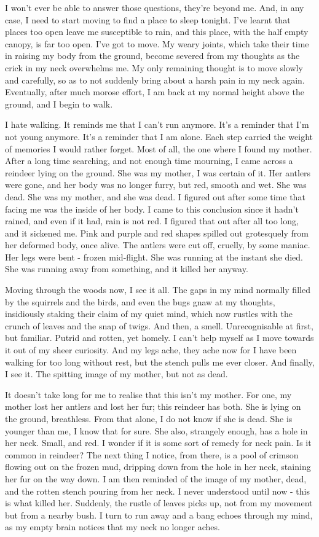 I won't ever be able to answer those questions, they're beyond me. And, in any case, I
need to start moving to find a place to sleep tonight. I've learnt that places too open
leave me susceptible to rain, and this place, with the half empty canopy, is far too open.
I've got to move. My weary joints, which take their time in raising my body from the
ground, become severed from my thoughts as the crick in my neck overwhelms me. My
only remaining thought is to move slowly and carefully, so as to not suddenly bring
about a harsh pain in my neck again. Eventually, after much morose effort, I am back at
my normal height above the ground, and I begin to walk.

I hate walking. It reminds me that I can't run anymore. It's a reminder that I'm not young
anymore. It's a reminder that I am alone. Each step carried the weight of memories I
would rather forget. Most of all, the one where I found my mother. After a long time
searching, and not enough time mourning, I came across a reindeer lying on the ground.
She was my mother, I was certain of it. Her antlers were gone, and her body was no
longer furry, but red, smooth and wet. She was dead. She was my mother, and she was
dead. I figured out after some time that facing me was the inside of her body. I came to
this conclusion since it hadn't rained, and even if it had, rain is not red. I figured that out
after all too long, and it sickened me. Pink and purple and red shapes spilled out
grotesquely from her deformed body, once alive. The antlers were cut off, cruelly, by
some maniac. Her legs were bent - frozen mid-flight. She was running at the instant she
died. She was running away from something, and it killed her anyway.

Moving through the woods now, I see it all. The gaps in my mind normally filled by the
squirrels and the birds, and even the bugs gnaw at my thoughts, insidiously staking their
claim of my quiet mind, which now rustles with the crunch of leaves and the snap of
twigs. And then, a smell. Unrecognisable at first, but familiar. Putrid and rotten, yet
homely. I can't help myself as I move towards it out of my sheer curiosity. And my legs
ache, they ache now for I have been walking for too long without rest, but the stench
pulls me ever closer. And finally, I see it. The spitting image of my mother, but not as dead.

It doesn't take long for me to realise that this isn't my mother. For one, my mother lost
her antlers and lost her fur; this reindeer has both. She is lying on the ground,
breathless. From that alone, I do not know if she is dead. She is younger than me, I know
that for sure. She also, strangely enough, has a hole in her neck. Small, and red. I
wonder if it is some sort of remedy for neck pain. Is it common in reindeer? The next
thing I notice, from there, is a pool of crimson flowing out on the frozen mud, dripping
down from the hole in her neck, staining her fur on the way down. I am then reminded of
the image of my mother, dead, and the rotten stench pouring from her neck. I never
understood until now - this is what killed her. Suddenly, the rustle of leaves picks up, not
from my movement but from a nearby bush. I turn to run away and a bang echoes
through my mind, as my empty brain notices that my neck no longer aches.